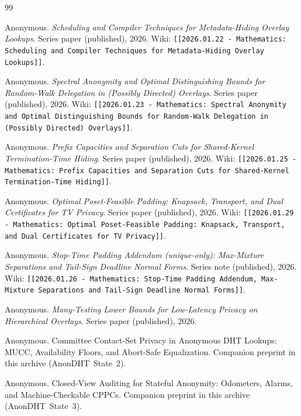 \documentclass[11pt]{article}
\begin{document}
\begin{thebibliography}{99}\small

Anonymous.
\newblock \emph{Scheduling and Compiler Techniques for Metadata-Hiding Overlay Lookups}.
\newblock Series paper (published), 2026.
\newblock Wiki: \texttt{[[2026.01.22 - Mathematics: Scheduling and Compiler Techniques for Metadata-Hiding Overlay Lookups]]}.

Anonymous.
\newblock \emph{Spectral Anonymity and Optimal Distinguishing Bounds for Random-Walk Delegation in (Possibly Directed) Overlays}.
\newblock Series paper (published), 2026.
\newblock Wiki: \texttt{[[2026.01.23 - Mathematics: Spectral Anonymity and Optimal Distinguishing Bounds for Random-Walk Delegation in (Possibly Directed) Overlays]]}.

Anonymous.
\newblock \emph{Prefix Capacities and Separation Cuts for Shared-Kernel Termination-Time Hiding}.
\newblock Series paper (published), 2026.
\newblock Wiki: \texttt{[[2026.01.25 - Mathematics: Prefix Capacities and Separation Cuts for Shared-Kernel Termination-Time Hiding]]}.

Anonymous.
\newblock \emph{Optimal Poset-Feasible Padding: Knapsack, Transport, and Dual Certificates for TV Privacy}.
\newblock Series paper (published), 2026.
\newblock Wiki: \texttt{[[2026.01.29 - Mathematics: Optimal Poset-Feasible Padding: Knapsack, Transport, and Dual Certificates for TV Privacy]]}.

Anonymous.
\newblock \emph{Stop-Time Padding Addendum (unique-only): Max-Mixture Separations and Tail-Sign Deadline Normal Forms}.
\newblock Series note (published), 2026.
\newblock Wiki: \texttt{[[2026.01.26 - Mathematics: Stop-Time Padding Addendum, Max-Mixture Separations and Tail-Sign Deadline Normal Forms]]}.

Anonymous.
\newblock \emph{Many-Testing Lower Bounds for Low-Latency Privacy on Hierarchical Overlays}.
\newblock Series paper (published), 2026.

Anonymous.
\newblock Committee Contact-Set Privacy in Anonymous DHT Lookups: MUCC, Availability Floors, and Abort-Safe Equalization.
\newblock Companion preprint in this archive (AnonDHT~State~2).

Anonymous.
\newblock Closed-View Auditing for Stateful Anonymity: Odometers, Alarms, and Machine-Checkable CPPCs.
\newblock Companion preprint in this archive (AnonDHT~State~3).


\end{thebibliography}
\end{document}
